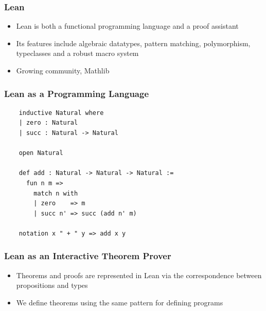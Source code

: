 \documentclass[usepdftitle=false,aspectratio=169,usenames,dvipsnames]{beamer}
\newcommand\vitem{\vfill\item}
\begin{document}
\begin{frame}
  \frametitle{Lean}
  \begin{itemize}
    \item Lean is both a functional programming language and a proof assistant
    \vitem Its features include algebraic datatypes, pattern matching, polymorphism, typeclasses and a robust macro system
    \vitem Growing community, Mathlib
  \end{itemize}
\end{frame}

\begin{frame}[fragile]
  \frametitle{Lean as a Programming Language}
  \begin{verbatim}
    inductive Natural where
    | zero : Natural
    | succ : Natural -> Natural

    open Natural

    def add : Natural -> Natural -> Natural :=
      fun n m =>
        match n with
        | zero    => m
        | succ n' => succ (add n' m)

    notation x " + " y => add x y
  \end{verbatim}
\end{frame}

\begin{frame}[fragile]
  \frametitle{Lean as an Interactive Theorem Prover}
  \begin{itemize}
    \item Theorems and proofs are represented in Lean via the correspondence between propositions and types
    \vitem We define theorems using the same pattern for defining programs

  \end{itemize}
\end{frame}
\end{document}
